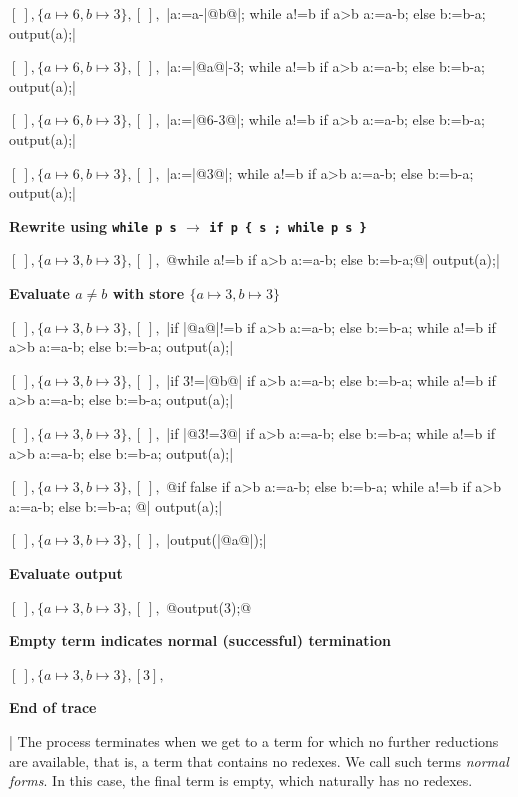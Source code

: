 \documentclass[11pt]{book}
\newcommand{\outdent}{\noindent\hspace*{-1.5cm}}
\newcommand{\outtext}[1]{{\outdent\normalsize\bf #1}}
\begin{document}
{\outdent$  [\ ],\{a \mapsto 6, b \mapsto 3\},[\ ],$ 
|a:=a-|@b@|; while a!=b if a>b a:=a-b; else b:=b-a; output(a);|$  $

 
\outdent$  [\ ],\{a \mapsto 6, b \mapsto 3\},[\ ],$ 
|a:=|@a@|-3; while a!=b if a>b a:=a-b; else b:=b-a; output(a);|$  $
 
\outdent$  [\ ],\{a \mapsto 6, b \mapsto 3\},[\ ],$ 
|a:=|@6-3@|; while a!=b if a>b a:=a-b; else b:=b-a; output(a);|$  $

\outdent$  [\ ],\{a \mapsto 6, b \mapsto 3\},[\ ],$ 
|a:=|@3@|; while a!=b if a>b a:=a-b; else b:=b-a; output(a);|$  $


\outtext{Rewrite using {\tt while p s} $\rightarrow$ {\tt if p \{ s ; while p s \}}}

\outdent$  [\ ],\{a \mapsto 3, b \mapsto 3\},[\ ],$ 
@while a!=b if a>b a:=a-b; else b:=b-a;@| output(a);|$  $

\outtext{Evaluate $ a \ne b$ with store $\{a \mapsto 3, b \mapsto 3\}$}

\outdent$  [\ ],\{a \mapsto 3, b \mapsto 3\},[\ ],$ 
|if |@a@|!=b { if a>b a:=a-b; else b:=b-a; while a!=b if a>b a:=a-b; else b:=b-a; } output(a);|$  $

\outdent$  [\ ],\{a \mapsto 3, b \mapsto 3\},[\ ],$ 
|if 3!=|@b@| { if a>b a:=a-b; else b:=b-a; while a!=b if a>b a:=a-b; else b:=b-a; } output(a);|$  $


\outdent$  [\ ],\{a \mapsto 3, b \mapsto 3\},[\ ],$ 
|if |@3!=3@| { if a>b a:=a-b; else b:=b-a; while a!=b if a>b a:=a-b; else b:=b-a; } output(a);|$  $

\outdent$  [\ ],\{a \mapsto 3, b \mapsto 3\},[\ ],$ 
@if false { if a>b a:=a-b; else b:=b-a; while a!=b if a>b a:=a-b; else b:=b-a; } @| output(a);|$  $

\outdent$  [\ ],\{a \mapsto 3, b \mapsto 3\},[\ ],$ 
|output(|@a@|);|$  $

\outtext{Evaluate output}

\outdent$  [\ ],\{a \mapsto 3, b \mapsto 3\},[\ ],$ 
@output(3);@$  $

\outtext{Empty term indicates normal (successful) termination}

\outdent$  [\ ],\{a \mapsto 3, b \mapsto 3\},[3],$ $  $

\outtext{End of trace}

}
\lstDeleteShortInline|
\lstDeleteShortInline@
\vspace*{3ex}
The process terminates when we get to a term for which no further reductions are available, that is, a term that contains no redexes. We call such terms {\em normal forms}. In this case, the final term is empty, which naturally has no redexes.
\end{document}
